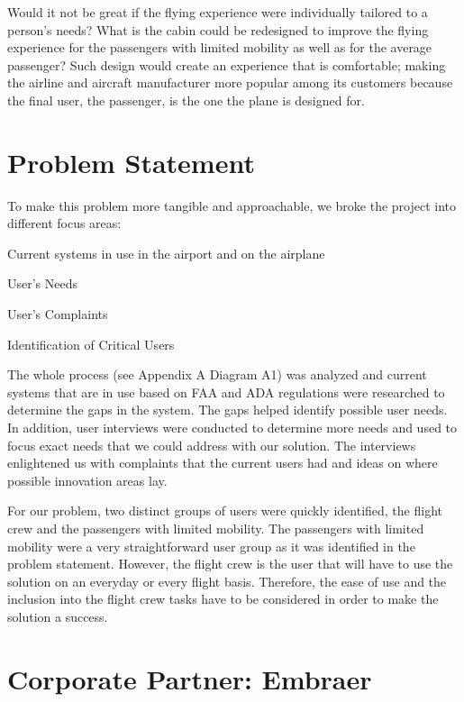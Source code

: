 Would it not be great if the flying experience were individually tailored to a person’s needs? What is the cabin could be redesigned to improve the flying experience for the passengers with limited mobility as well as for the average passenger? Such design would create an experience that is comfortable; making the airline and aircraft manufacturer more popular among its customers because the final user, the passenger, is the one the plane is designed for.

\section{Problem Statement}
To make this problem more tangible and approachable, we broke the project into different focus areas:

\begin{list}{-}{}
  \item Current systems in use in the airport and on the airplane
  \item User's Needs
  \item User's Complaints
  \item Identification of Critical Users
\end{list}

The whole process (see Appendix A Diagram A1) was analyzed and current systems that are in use based on FAA and ADA regulations were researched to determine the gaps in the system.  The gaps helped identify possible user needs.  In addition, user interviews were conducted to determine more needs and used to focus exact needs that we could address with our solution.  The interviews enlightened us with complaints that the current users had and ideas on where possible innovation areas lay.

For our problem, two distinct groups of users were quickly identified, the flight crew and the passengers with limited mobility.   The passengers with limited mobility were a very straightforward user group as it was identified in the problem statement.  However, the flight crew is the user that will have to use the solution on an everyday or every flight basis.  Therefore, the ease of use and the inclusion into the flight crew tasks have to be considered in order to make the solution a success.

\section{Corporate Partner: Embraer}

